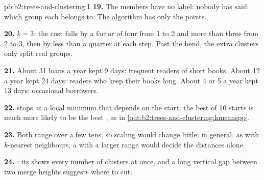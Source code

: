 \begin{solution}{pb:b2:trees-and-clustering:1}
\textbf{19.} The members have no label: nobody has said which group each belongs to. The algorithm has only the points.

\textbf{20.} $k = 3$: the cost falls by a factor of four from 1 to 2 and more than three from 2 to 3, then by less than a
quarter at each step. Past the bend, the extra clusters only split real groups.

\textbf{21.} About 31 loans a year kept 9 days: frequent readers of short books. About 12 a year kept 24 days: readers who
keep their books long. About 4 or 5 a year kept 13 days: occasional borrowers.

\textbf{22.}  stops at a local minimum that depends on the start; the best of 10 starts is much more
likely to be the best , as in \cref{out:b2:trees-and-clustering:kmeanspp}.

\textbf{23.} Both  range over a few tens, so scaling would change little; in general, as with $k$-nearest
neighbours, a  with a larger range would decide the distances alone.

\textbf{24.} : its  shows every number of clusters at once, and a long
vertical gap between two merge heights suggests where to cut.
\end{solution}
